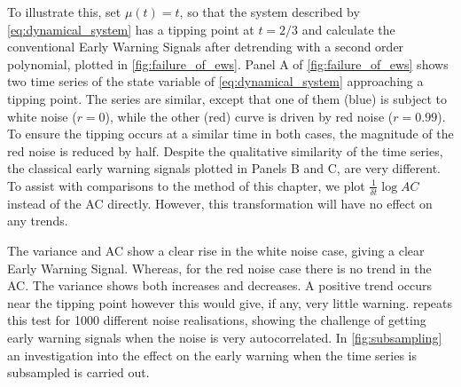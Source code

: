 To illustrate this, set $\mu(t) = t$, so that the system described by \cref{eq:dynamical_system} has
a tipping point at $t=2/3$ and calculate the conventional Early 
Warning Signals after detrending with a second order polynomial, plotted in \cref{fig:failure_of_ews}.
Panel A of \cref{fig:failure_of_ews} shows two time series of the 
state variable of \cref{eq:dynamical_system} approaching a tipping point.
The series are similar, except that one of them (blue) is subject to white noise ($r = 0$), 
while the other (red) curve is driven by red noise ($r = 0.99$). To
ensure the tipping occurs at a similar time in both
cases, the magnitude of the red noise is reduced by half.
Despite the qualitative similarity of the time series,
the classical early warning signals plotted in Panels B and C, are very different. To assist with comparisons to the method of this chapter, we
plot $\frac{1}{\delta t}\log AC$ instead of the AC directly. However, this
transformation will have no effect on any trends.

The variance and AC show a clear rise in
the white noise case, giving a clear Early Warning Signal. 
Whereas, for the red noise case there is no trend in the AC. The 
variance shows both increases and decreases. A positive trend occurs near
the tipping point however this would give, if any, very little warning. 
repeats this test for 1000 different noise realisations, showing the
challenge of getting early warning signals when the noise is very 
autocorrelated. In \cref{fig:subsampling} an investigation into the effect on the early warning when the time series
is subsampled is carried out.


